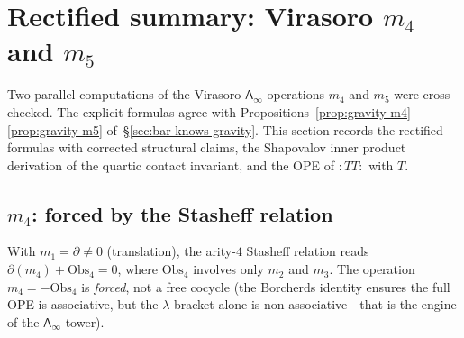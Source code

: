 \documentclass[11pt]{article}
\newcommand{\Ainf}{\mathsf{A}_{\infty}}
\newcommand{\normord}[1]{:\!#1\!:}
\begin{document}
\section{Rectified summary: Virasoro $m_4$ and $m_5$}
\label{sec:virasoro-m4-m5-rectified}

Two parallel computations of the Virasoro $\Ainf$ operations
$m_4$ and $m_5$ were cross-checked.  The explicit formulas agree
with Propositions~\ref*{prop:gravity-m4}--\ref*{prop:gravity-m5}
of~\S\ref*{sec:bar-knows-gravity}.  This section records the
rectified formulas with corrected structural claims, the
Shapovalov inner product derivation of the quartic contact
invariant, and the OPE of $\normord{TT}$ with $T$.

\subsection{$m_4$: forced by the Stasheff relation}

With $m_1 = \partial \ne 0$ (translation), the arity-$4$ Stasheff
relation reads $\partial(m_4) + \mathrm{Obs}_4 = 0$, where
$\mathrm{Obs}_4$ involves only $m_2$ and $m_3$.
The operation $m_4 = -\mathrm{Obs}_4$ is \emph{forced}, not a free
cocycle (the Borcherds identity ensures the full OPE is associative,
but the $\lambda$-bracket alone is non-associative---that is the
engine of the $\Ainf$ tower).
\end{document}
